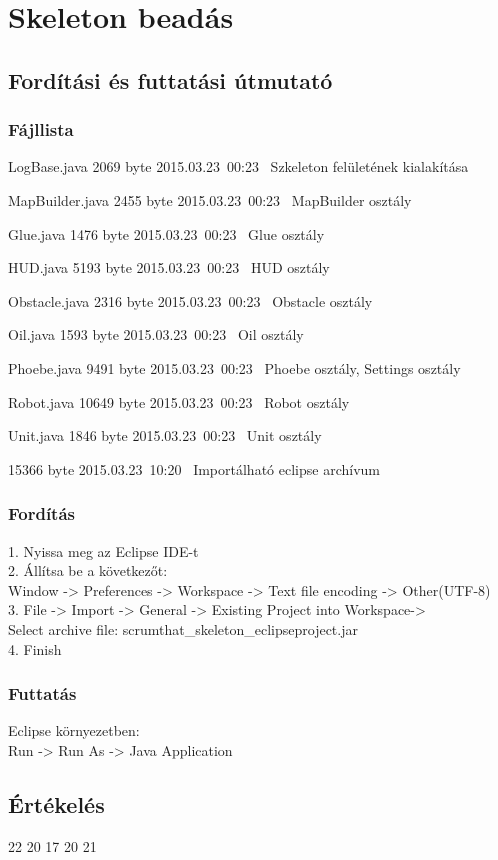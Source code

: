 \setcounter{chapter}{5}
\chapter{Skeleton beadás}
\section{Fordítási és futtatási útmutató}

\subsection{Fájllista}

\begin{fajllista}

\fajl
{LogBase.java} %
{2069 byte} %
{2015.03.23~00:23~} %
{Szkeleton felületének kialakítása} %

\fajl
{MapBuilder.java}
{2455 byte}
{2015.03.23~00:23~}
{MapBuilder osztály}

\fajl
{Glue.java}
{1476 byte}
{2015.03.23~00:23~}
{Glue osztály}

\fajl
{HUD.java}
{5193 byte}
{2015.03.23~00:23~}
{HUD osztály}

\fajl
{Obstacle.java}
{2316 byte}
{2015.03.23~00:23~}
{Obstacle osztály}

\fajl
{Oil.java}
{1593 byte}
{2015.03.23~00:23~}
{Oil osztály}

\fajl
{Phoebe.java}
{9491 byte}
{2015.03.23~00:23~}
{Phoebe osztály, Settings osztály}

\fajl
{Robot.java}
{10649 byte}
{2015.03.23~00:23~}
{Robot osztály}

\fajl
{Unit.java}
{1846 byte}
{2015.03.23~00:23~}
{Unit osztály}

\fajl
{
}
{15366 byte}
{2015.03.23~10:20~}
{Importálható eclipse archívum}

\end{fajllista}

\subsection{Fordítás}

1. Nyissa meg az Eclipse IDE-t\\
2. Állítsa be a következőt: \\
Window -> Preferences -> Workspace -> Text file encoding -> Other(UTF-8)\\
3. File -> Import -> General -> Existing Project into Workspace-> \\Select archive file: scrumthat\_skeleton\_eclipseproject.jar\\
4. Finish

\subsection{Futtatás}
Eclipse környezetben:\\
Run -> Run As -> Java Application

\section{Értékelés}

\begin{ertekeles}
{22}        %
{20}
{17}
{20}
{21}
\end{ertekeles}


